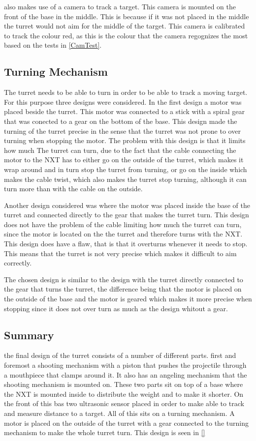 \name also makes use of a camera to track a target. This camera is mounted on
the front of the base in the middle. This is because if it was not placed in the
middle the turret would not aim for the middle of the target. This camera is
calibrated to track the colour red, as this is the colour that the camera
regognizes the most based on the tests in \autoref{CamTest}.

\subsection{Turning Mechanism}
The turret needs to be able to turn in order to be able to track a moving
target. For this purpose three designs were considered. In the first design a
motor was placed beside the turret. This motor was connected to a stick with a
spiral gear that was conected to a gear on the bottom of the base. This design
made the turning of the turret precise in the sense that the turret was not
prone to over turning when stopping the motor. The problem with this design is
that it limits how much The turret can turn, due to the fact that the cable
connecting the motor to the NXT has to either go on the outside of the turret,
which makes it wrap around and in turn stop the turret from turning, or go on
the inside which makes the cable twist, which also makes the turret stop
turning, although it can turn more than with the cable on the outside.\nl

Another design considered was where the motor was placed inside the base of the
turret and connected directly to the gear that makes the turret turn. This
design does not have the problem of the cable limiting how much the turret can
turn, since the motor is located on the the turret and therefore turns with the
NXT. This design does have a flaw, that is that it overturns whenever it needs
to stop. This means that the turret is not very precise which makes it difficult to
aim correctly.\nl

The chosen design is similar to the design with the turret directly connected to
the gear that turns the turret, the difference being that the motor is placed on
the outside of the base and the motor is geared which makes it more precise when
stopping since it does not over turn as much as the design whitout a gear. 

\subsection{Summary}
the final design of the turret consists of a number of different parts. first
and foremost a shooting mechanism with a piston that pushes the projectile
through a mouthpiece that clamps around it. It also has an angeling mechanism
that the shooting mechanism is mounted on. These two parts sit on top of a
base where the NXT is mounted inside to distribute the weight and to make it
shorter. On the front of this bas two ultrasonic sensor placed in order to make
\name able to track and measure distance to a target. All of this sits on a
turning mechanism. A motor is placed on the outside of the
turret with a gear connected to the turning mechanism to make the whole turret
turn. This design is seen in \autoref{}
